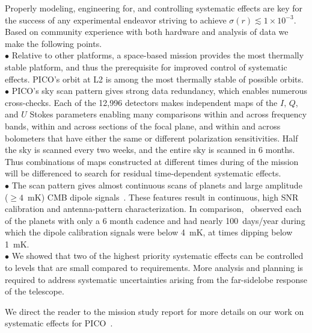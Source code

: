 \documentclass[PICOAPC.tex]{subfiles}
\begin{document}
Properly modeling, engineering for, and controlling systematic effects are key for the success of any experimental endeavor striving to achieve $\sigma(r) \lesssim 1 \times 10^{-3}$. Based on community experience with both hardware and analysis of data we make the following points.  \\
$\bullet$ \hspace{0.1in}  Relative to other platforms, a space-based mission provides the most thermally stable platform, and thus the prerequisite for improved control of systematic effects. PICO's orbit at L2 is among the most thermally stable of possible orbits. \\
$\bullet$ \hspace{0.1in} PICO's sky scan pattern gives strong data redundancy, which enables numerous cross-checks. Each of the 12,996 detectors makes independent maps of the $I,\,Q$, and $U$ Stokes parameters enabling many comparisons within and across frequency bands, within and across sections of the focal plane, and within and across bolometers that have either the same or different polarization sensitivities. Half the sky is scanned every two weeks, and the entire sky is scanned in 6 months. Thus combinations of maps constructed at different times during of the mission will be differenced to search for residual time-dependent systematic effects. \\
$\bullet$ \hspace{0.1in}  The scan pattern gives almost continuous scans of planets and large amplitude ($\geq 4$~mK) CMB dipole signals~\citep{picoweb_dipole}. These features result in continuous, high \ac{SNR} calibration and antenna-pattern characterization. In comparison, \planck\ observed each of the planets with only a 6 month cadence and had nearly 100~days/year during which the dipole calibration signals were below 4~mK, at times dipping below 1~mK. \\
$\bullet$ \hspace{0.1in}  We showed that two of the highest priority systematic effects can be controlled to levels that are small compared to requirements. More analysis and planning is required to address systematic uncertainties arising from the far-sidelobe response of the telescope. 

We direct the reader to the mission study report for more details on our work on systematic effects for PICO~\citep{pico_report}.
\end{document}
